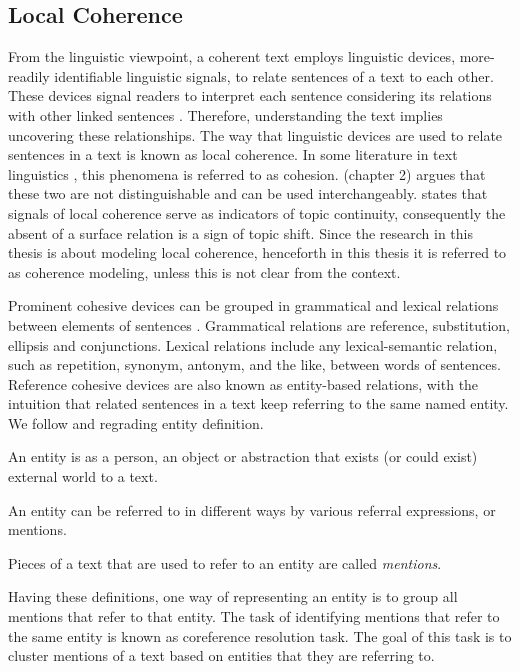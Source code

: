 \subsection{Local Coherence}

From the linguistic viewpoint, a coherent text employs linguistic devices, more-readily identifiable linguistic signals, to relate sentences of a text to each other. 
These devices signal readers to interpret each sentence considering its relations with other linked sentences \cite{vandijk77}. 
Therefore, understanding the text implies uncovering these relationships.  
The way that linguistic devices are used to relate sentences in a text is known as local coherence. 
In some literature in text linguistics \cite{halliday76}, this phenomena is referred to as cohesion.   
 (chapter 2) argues that these two are not distinguishable and can be used interchangeably. 
 states that signals of local coherence serve as indicators of topic continuity, consequently the absent of a surface relation is a sign of topic shift. 
Since the research in this thesis is about modeling local coherence, henceforth in this thesis it is referred to as coherence modeling, unless this is not clear from the context. 

Prominent cohesive devices can be grouped in grammatical and lexical relations between elements of sentences \cite{halliday76}. 
Grammatical relations are reference, substitution, ellipsis and conjunctions. 
Lexical relations include any lexical-semantic relation, such as repetition, synonym, antonym, and the like, between words of sentences. 
Reference cohesive devices are also known as entity-based relations, with the intuition that related sentences in a text keep referring to the same named entity. 
We follow  and  regrading entity definition.  

\begin{definition}
    An entity is as a person, an object or abstraction that exists (or could exist) external world to a text. 
\end{definition}

An entity can be referred to in different ways by various referral expressions, or mentions. 

\begin{definition}
	Pieces of a text that are used to refer to an entity are called \emph{mentions}. 
\end{definition}

Having these definitions, one way of representing an entity is to group all mentions that refer to that entity. 
The task of identifying mentions that refer to the same entity is known as coreference resolution task.  
The goal of this task is to cluster mentions of a text based on entities that they are referring to.  

